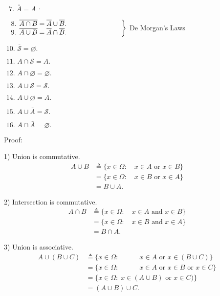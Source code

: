 \documentclass[12pt,thmsa]{article}
\begin{document}
\( \begin{array}{l} \text{ 7. } \overline{\overline{A}}=A\end{array}. \)

\(\left.\begin{array}{l} 
	\text { 8. } \overline{ {\color{black}{A}} \cap {\color{black}{B}} }=\overline{\color{black}{A}} \cup \overline{\color{black}{B}}. \\ 
	\text { 9. } \overline{ {\color{black}{A}} \cup {\color{black}{B}} }=\overline{\color{black}{A}} \cap \overline{\color{black}{B}}.\end{array} \qquad \qquad \qquad \quad \; \;\right\}\) De Morgan's Laws

 \(	\text { 10. }\overline{\mathcal{S}}=\varnothing. \)

 \(	\text { 11. }A \cap \mathcal{S}=A.\)

 \(	\text { 12. }A \cap \varnothing=\varnothing.\)

 \(	\text { 13. }A \cup \mathcal{S}= \mathcal{S}.\)

 \(	\text { 14. }A \cup \varnothing=A.\)

 \(	\text { 15. }A \cup \bar{A}= \mathcal{S}.\)

 \(	\text { 16. }A \cap \bar{A}=\varnothing.\)

\noindent
Proof:

1) Union is commutative.
\[
\begin{aligned}
	A \cup B & \triangleq\{x \in \Omega: \quad x \in A \text { or } x \in B\} \\
	&=\{x \in \Omega: \quad x \in B \text { or } x \in A\} \\
	&=B \cup A.
\end{aligned}
\]

\medskip

2) Intersection is commutative.
\[
\begin{aligned}
	A \cap B & \triangleq\{x \in \Omega: \quad x \in A \text { and } x \in B\} \\
	&=\{x \in \Omega: \quad x \in B \text { and } x \in A\} \\
	&=B \cap A.
\end{aligned}
\]

\medskip

3)  Union is associative.
\[
\begin{aligned}
	A \cup(B \cup C) &\triangleq \{x \in \Omega: \qquad \quad x \in A \text { or } x \in(B \cup C)\} \\
	&=\{x \in \Omega: \qquad \quad x \in A \text { or } x \in B \text { or } x \in C\} \\
	&=\{x \in \Omega: \; x \in(A \cup B) \text {  or } x \in C)\} \\
	&=(A \cup B) \cup C.
\end{aligned}
\]
\end{document}
